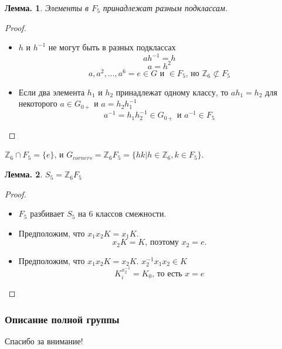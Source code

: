 \documentclass[utf8,russian]{beamer}
\newtheorem{ru_theo}{Лемма.}
\renewenvironment{theorem}{\begin{ru_theo}}{\end{ru_theo}}
\begin{document}
\begin{frame}
\begin{theorem}
	Элементы в $F_5$ принадлежат разным подклассам.
\end{theorem}
\begin{proof}
\begin{itemize}
	\item $h$ и $h^{-1}$ не могут быть в разных подклассах
	$$ah^{-1}=h$$
	$$a=h^2$$
	$$a,a^2,\ldots,a^6=e\in G\text{ и }\in F_5\text{, но }\mathbb{Z}_6\not\subset F_5$$
	\item
	Если два элемента $h_1$ и $h_2$ принадлежат одному классу, то $ah_1=h_2$ для некоторого $a\in G_{0+}$ и $a=h_2h_1^{-1}$ $$a^{-1}=h_1h_2^{-1}\in G_{0+}\text{ и }a^{-1}\in F_5$$
\end{itemize}
\vspace*{-0.4cm}
\end{proof}
$\mathbb{Z}_6\cap F_5=\{e\}$, и $G_{corners}=\mathbb{Z}_6F_5=\{hk|h\in\mathbb{Z}_6,k\in F_5\}$.
\end{frame}


\begin{frame}
\begin{theorem}
$S_5=\mathbb{Z}_6F_5$
\end{theorem}
\begin{proof}
	\begin{itemize}
		\item $F_5$ разбивает $S_5$ на 6 классов смежности.
		\item Предположим, что $x_1x_2K=x_1K$. $$x_2K=K\text{, поэтому } x_2=e\text{.}$$
		\item Предположим, что $x_1x_2K=x_2K$. $x_2^{-1}x_1x_2\in K$
		$$K_i^{x_2^{-1}}=K_0\text{, то есть } x=e$$
	\end{itemize}
\end{proof}
\end{frame}


\begin{frame}
\frametitle{Описание полной группы}
\end{frame}


\begin{frame}
\Huge{\centerline{Спасибо за внимание!}}
\end{frame}

\end{document}
